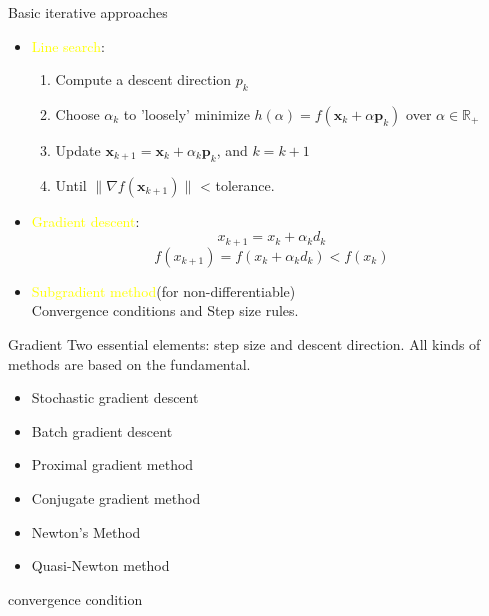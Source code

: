     \begin{frame}{Basic iterative approaches}
      \begin{itemize}
        \item \textcolor{yellow}{Line search}:
        \begin{enumerate}
          \item Compute a descent direction $p_k$
          \item Choose $ \displaystyle \alpha _{k} $ to 'loosely' minimize $ h(\alpha )=f(\mathbf {x} _{k}+\alpha \mathbf {p} _{k}) $ over $ \alpha \in \mathbb {R} _{+}$
          \item Update $ \mathbf {x} _{k+1}=\mathbf {x} _{k}+\alpha _{k}\mathbf {p} _{k} $, and $ {\textstyle k=k+1} $
          \item Until $ \|\nabla f(\mathbf {x} _{k+1})\| $ < tolerance.
        \end{enumerate}

        \item \textcolor{yellow}{Gradient descent}:
        \[x_{k+1}=x_k+\alpha_k d_k\]
        \[f(x_{k+1}) = f(x_k+\alpha_k d_k) < f(x_k)\]
        \item \textcolor{yellow}{Subgradient method}(for non-differentiable)
        \\
        Convergence conditions and Step size rules.
      \end{itemize}
    \end{frame}

    \begin{frame}{Gradient}
      Two essential elements: step size and descent direction. All kinds of methods are based on the fundamental.
      \begin{itemize}
        \item Stochastic gradient descent
        \item Batch gradient descent
        \item Proximal gradient method
        \item Conjugate gradient method
        \item Newton's Method
        \item Quasi-Newton method
      \end{itemize}
      convergence condition
    \end{frame}

